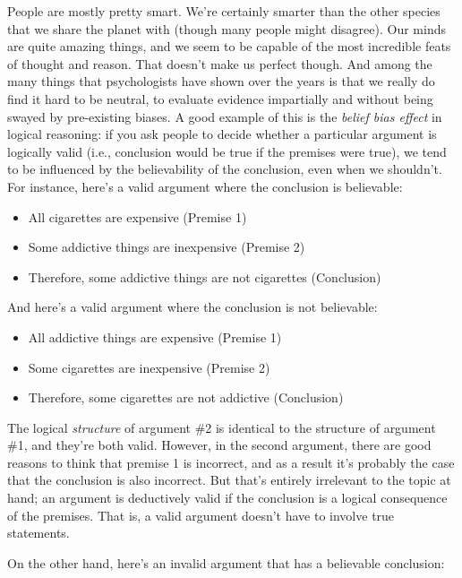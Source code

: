 \documentclass[
]{book}
\providecommand{\tightlist}{%
  \setlength{\itemsep}{0pt}\setlength{\parskip}{0pt}}
\begin{document}
People are mostly pretty smart. We're certainly smarter than the other species that we share the planet with (though many people might disagree). Our minds are quite amazing things, and we seem to be capable of the most incredible feats of thought and reason. That doesn't make us perfect though. And among the many things that psychologists have shown over the years is that we really do find it hard to be neutral, to evaluate evidence impartially and without being swayed by pre-existing biases. A good example of this is the \emph{belief bias effect} in logical reasoning: if you ask people to decide whether a particular argument is logically valid (i.e., conclusion would be true if the premises were true), we tend to be influenced by the believability of the conclusion, even when we shouldn't. For instance, here's a valid argument where the conclusion is believable:

\begin{itemize}
\tightlist
\item
  All cigarettes are expensive (Premise 1)
\item
  Some addictive things are inexpensive (Premise 2)
\item
  Therefore, some addictive things are not cigarettes (Conclusion)
\end{itemize}

And here's a valid argument where the conclusion is not believable:

\begin{itemize}
\tightlist
\item
  All addictive things are expensive (Premise 1)
\item
  Some cigarettes are inexpensive (Premise 2)
\item
  Therefore, some cigarettes are not addictive (Conclusion)
\end{itemize}

The logical \emph{structure} of argument \#2 is identical to the structure of argument \#1, and they're both valid. However, in the second argument, there are good reasons to think that premise 1 is incorrect, and as a result it's probably the case that the conclusion is also incorrect. But that's entirely irrelevant to the topic at hand; an argument is deductively valid if the conclusion is a logical consequence of the premises. That is, a valid argument doesn't have to involve true statements.

On the other hand, here's an invalid argument that has a believable conclusion:
\end{document}
